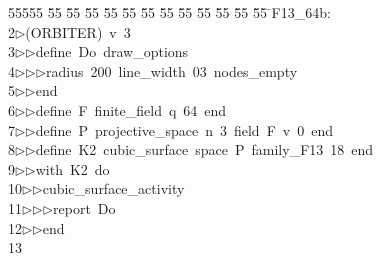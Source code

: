 %
%
\begin{tabbing}
55555 \= 55 \= 55 \= 55 \= 55 \= 55 \= 55 \= 55 \= 55 \= 55 \= 55 \= 55 \= 55 \= \>F13\_64b:\\[0pt]
2\>$\triangleright$\>(ORBITER)\ v\ 3\ \\[0pt]
3\>$\triangleright$\>$\triangleright$\>define\ Do\ draw\_options\ \\[0pt]
4\>$\triangleright$\>$\triangleright$\>$\triangleright$\>radius\ 200\ line\_width\ 03\ nodes\_empty\ \\[0pt]
5\>$\triangleright$\>$\triangleright$\>end\ \\[0pt]
6\>$\triangleright$\>$\triangleright$\>define\ F\ finite\_field\ q\ 64\ end\ \\[0pt]
7\>$\triangleright$\>$\triangleright$\>define\ P\ projective\_space\ n\ 3\ field\ F\ v\ 0\ end\ \\[0pt]
8\>$\triangleright$\>$\triangleright$\>define\ K2\ cubic\_surface\ space\ P\ family\_F13\ 18\ end\ \\[0pt]
9\>$\triangleright$\>$\triangleright$\>with\ K2\ do\ \\[0pt]
10\>$\triangleright$\>$\triangleright$\>cubic\_surface\_activity\ \\[0pt]
11\>$\triangleright$\>$\triangleright$\>$\triangleright$\>report\ Do\ \\[0pt]
12\>$\triangleright$\>$\triangleright$\>end\\[0pt]
13\>\end{tabbing}
